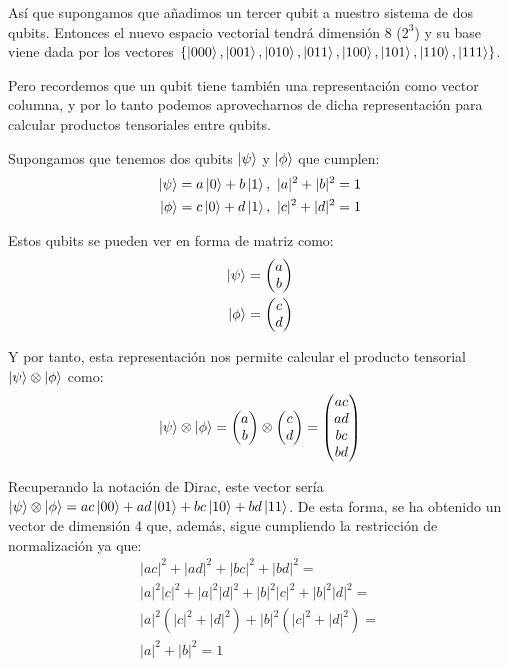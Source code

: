 Así que supongamos que añadimos un tercer qubit a nuestro sistema de dos qubits. Entonces el nuevo espacio vectorial tendrá dimensión 8 ($2^3$) y su base viene dada por los vectores $\{\left|000\right\rangle,\left|001\right\rangle,\left|010\right\rangle,\left|011\right\rangle,\left|100\right\rangle,\left|101\right\rangle,\left|110\right\rangle,\left|111\right\rangle\}$.

Pero recordemos que un qubit tiene también una representación como vector columna, y por lo tanto podemos aprovecharnos de dicha representación para calcular  productos tensoriales entre qubits.

Supongamos que tenemos dos qubits $\left|\psi\right\rangle$ y $\left|\phi\right\rangle$ que cumplen:\\
\begin{equation}
\begin{split}
\left|\psi\right\rangle=a\left|0\right\rangle+b\left|1\right\rangle,\ |a|^2 + |b|^2 = 1\\
\left|\phi\right\rangle=c\left|0\right\rangle+d\left|1\right\rangle,\ |c|^2 + |d|^2 = 1
\end{split}
\end{equation}

Estos qubits se pueden ver en forma de matriz como:
\begin{equation}
\begin{split}
\left|\psi\right\rangle = \begin{pmatrix} a \\ b \end{pmatrix}\\
\left|\phi\right\rangle = \begin{pmatrix} c \\ d \end{pmatrix}
\end{split}
\end{equation}

Y por tanto, esta representación nos permite calcular el producto tensorial $\left|\psi\right\rangle\otimes\left|\phi\right\rangle$ como:
\begin{equation}
\left|\psi\right\rangle\otimes\left|\phi\right\rangle = \begin{pmatrix} a \\ b \end{pmatrix}\otimes\begin{pmatrix} c \\ d \end{pmatrix} = \begin{pmatrix} ac \\ ad \\ bc \\ bd  \end{pmatrix}
\end{equation}

Recuperando la notación de Dirac, este vector sería $\left|\psi\right\rangle\otimes\left|\phi\right\rangle = ac\left|00\right\rangle + ad\left|01\right\rangle + bc\left|10\right\rangle + bd\left|11\right\rangle$. De esta forma, se ha obtenido un vector de dimensión 4 que, además, sigue cumpliendo la restricción de normalización ya que:
\begin{equation}
\begin{split}
 |ac|^2 + |ad|^2 + |bc|^2 + |bd|^2 =\\ |a|^2|c|^2 + |a|^2|d|^2 + |b|^2|c|^2 + |b|^2|d|^2 =\\ |a|^2(|c|^2 + |d|^2) + |b|^2(|c|^2 + |d|^2) =\\ |a|^2 + |b|^2 = 1
\end{split}
\end{equation}

